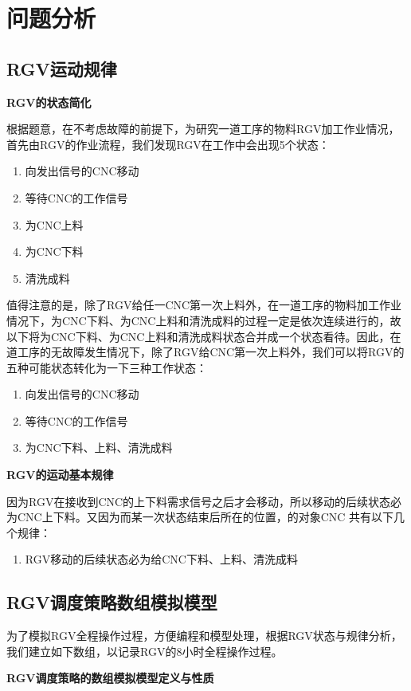 \documentclass[withoutpreface,bwprint]{cumcmthesis} %
\begin{document}
\section{问题分析}
\subsection{RGV运动规律}
\label{RGV运动规则}
\textbf{RGV的状态简化}

根据题意，在不考虑故障的前提下，为研究一道工序的物料RGV加工作业情况，首先由RGV的作业流程，我们发现RGV在工作中会出现5个状态：
\begin{enumerate}
\item 向发出信号的CNC移动
\item 等待CNC的工作信号
\item 为CNC上料
\item 为CNC下料
\item 清洗成料
\end{enumerate}

值得注意的是，除了RGV给任一CNC第一次上料外，在一道工序的物料加工作业情况下，为CNC下料、为CNC上料和清洗成料的过程一定是依次连续进行的，故以下将为CNC下料、为CNC上料和清洗成料状态合并成一个状态看待。因此，在道工序的无故障发生情况下，除了RGV给CNC第一次上料外，我们可以将RGV的五种可能状态转化为一下三种工作状态：
\begin{enumerate}
\item 向发出信号的CNC移动
\item 等待CNC的工作信号
\item 为CNC下料、上料、清洗成料
\end{enumerate}

\textbf{RGV的运动基本规律}

因为RGV在接收到CNC的上下料需求信号之后才会移动，所以移动的后续状态必为CNC上下料。又因为而某一次状态结束后所在的位置，的对象CNC
共有以下几个规律：
\begin{enumerate}
\item RGV移动的后续状态必为给CNC下料、上料、清洗成料
\end{enumerate}

\subsection{RGV调度策略数组模拟模型}

为了模拟RGV全程操作过程，方便编程和模型处理，根据RGV状态与规律分析，我们建立如下数组，以记录RGV的8小时全程操作过程。

\textbf{RGV调度策略的数组模拟模型定义与性质}
\end{document}
